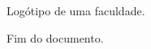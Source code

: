 \documentclass[twoside,a4paper,10pt]{article}
\begin{document}
Logótipo de uma faculdade.
\begin{figure}[!h]
\end{figure}

Fim do documento.
\end{document}
